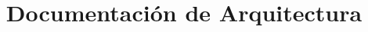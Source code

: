 \documentclass{article}
\begin{document}
\title{Documentación de Arquitectura}
\maketitle


\end{document}
